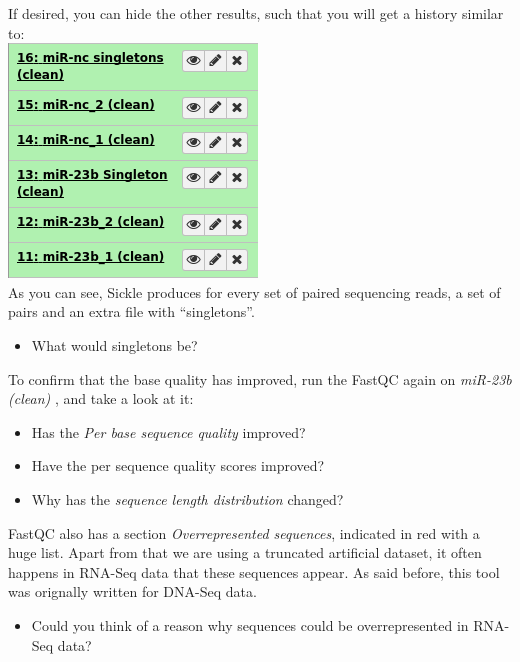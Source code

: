 If desired, you can hide the other results, such that you will get a history similar to:\\
\includegraphics[scale=0.55]{figures/qc_07.png}\\
As you can see, Sickle produces for every set of paired sequencing reads, a set of pairs and an extra file with ``singletons''.
\begin{itemize}
	\item What would singletons be?
\end{itemize}
To confirm that the base quality has improved, run the FastQC again on \textit{ miR-23b (clean) }, and take a look at it:
\begin{itemize}
	\item Has the \textit{Per base sequence quality} improved?
	\item Have the per sequence quality scores improved?
	\item Why has the \textit{sequence length distribution} changed?
\end{itemize}
FastQC also has a section \textit{Overrepresented sequences}, indicated in red with a huge list. Apart from that we are using a truncated artificial dataset, it often happens in RNA-Seq data that these sequences appear. As said before, this tool was orignally written for DNA-Seq data.
\begin{itemize}
	\item Could you think of a reason why sequences could be overrepresented in RNA-Seq data?
\end{itemize}
